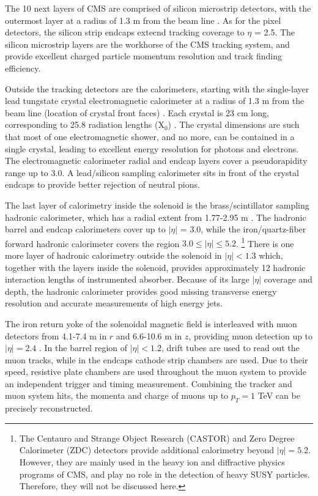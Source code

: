 \documentclass[dissertation.tex]{subfiles}
\begin{document}
The 10 next layers of CMS are comprised of silicon microstrip detectors, with the outermost layer at a radius of 1.3 m from the beam line \cite{1748-0221-3-08-S08004}.  As for the pixel detectors, the silicon strip endcaps extecnd tracking coverage to $\eta$ = 2.5.  The silicon microstrip layers are the workhorse of the CMS tracking system, and provide excellent charged particle momentum resolution and track finding efficiency.

Outside the tracking detectors are the calorimeters, starting with the single-layer lead tungstate crystal electromagnetic calorimeter at a radius of 1.3 m from the beam line (location of crystal front faces) \cite{1748-0221-3-08-S08004}.  Each crystal is 23 cm long, corresponding to 25.8 radiation lengths ($\mbox{X}_{0}$)  \cite{1748-0221-3-08-S08004}.  The crystal dimensions are such that most of one electromagnetic shower, and no more, can be contained in a single crystal, leading to excellent energy resolution for photons and electrons.  The electromagnetic calorimeter radial and endcap layers cover a pseudorapidity range up to 3.0.  A lead/silicon sampling calorimeter sits in front of the crystal endcaps to provide better rejection of neutral pions.

The last layer of calorimetry inside the solenoid is the brass/scintillator sampling hadronic calorimeter, which has a radial extent from 1.77-2.95 m \cite{1748-0221-3-08-S08004}.  The hadronic barrel and endcap calorimeters cover up to $|\eta|$ = 3.0, while the iron/quartz-fiber forward hadronic calorimeter covers the region $3.0 \leq |\eta| \leq 5.2$. \footnote{The Centauro and Strange Object Research (CASTOR) and Zero Degree Calorimeter (ZDC) detectors provide additional calorimetry beyond $|\eta| = 5.2$.  However, they are mainly used in the heavy ion and diffractive physics programs of CMS, and play no role in the detection of heavy SUSY particles.  Therefore, they will not be discussed here.}  There is one more layer of hadronic calorimetry outside the solenoid in $|\eta| < 1.3$ which, together with the layers inside the solenoid, provides approximately 12 hadronic interaction lengths of instrumented absorber.  Because of its large $|\eta|$ coverage and depth, the hadronic calorimeter provides good missing transverse energy resolution and accurate measurements of high energy jets.

The iron return yoke of the solenoidal magnetic field is interleaved with muon detectors from 4.1-7.4 m in $r$ and 6.6-10.6 m in $z$, providing muon detection up to $|\eta| = 2.4$ \cite{1748-0221-3-08-S08004}.  In the barrel region of $|\eta| < 1.2$, drift tubes are used to read out the muon tracks, while in the endcaps cathode strip chambers are used.  Due to their speed, resistive plate chambers are used throughout the muon system to provide an independent trigger and timing measurement.  Combining the tracker and muon system hits, the momenta and charge of muons up to $p_{T} = 1$ TeV can be precisely reconstructed.
\end{document}
